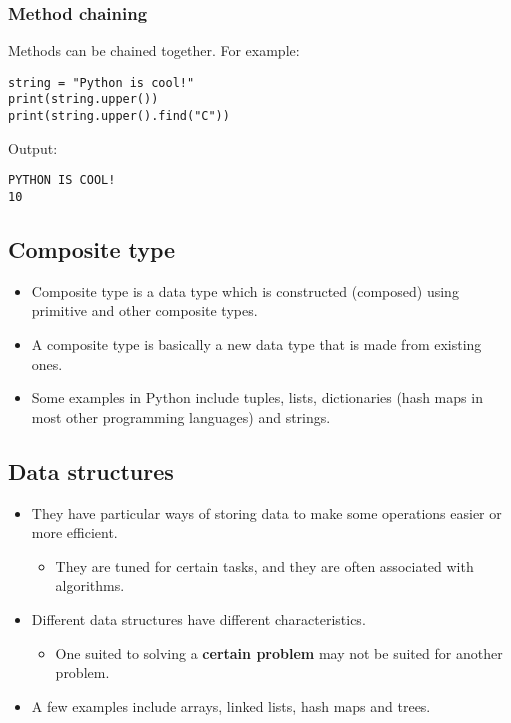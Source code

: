 \documentclass[11pt]{article}
\begin{document}
\subsubsection{Method chaining}
\label{sec:org578eef6}
Methods can be chained together. For example:
\begin{verbatim}
string = "Python is cool!"
print(string.upper())
print(string.upper().find("C"))
\end{verbatim}

 \noindent Output:

\label{orge795339}
\begin{verbatim}
PYTHON IS COOL!
10
\end{verbatim}
\subsection{Composite type}
\label{sec:orga0fa136}
\begin{itemize}
\item Composite type is a data type which is constructed (composed) using primitive and other composite types.
\item A composite type is basically a new data type that is made from existing ones.
\item Some examples in Python include tuples, lists, dictionaries (hash maps in most other programming languages) and strings.
\end{itemize}
\subsection{Data structures}
\label{sec:orge5bbb53}
\begin{itemize}
\item They have particular ways of storing data to make some operations easier or more efficient.
\begin{itemize}
\item They are tuned for certain tasks, and they are often associated with algorithms.
\end{itemize}
\item Different data structures have different characteristics.
\begin{itemize}
\item One suited to solving a \textbf{certain problem} may not be suited for another problem.
\end{itemize}
\item A few examples include arrays, linked lists, hash maps and trees.
\end{itemize}
\end{document}
